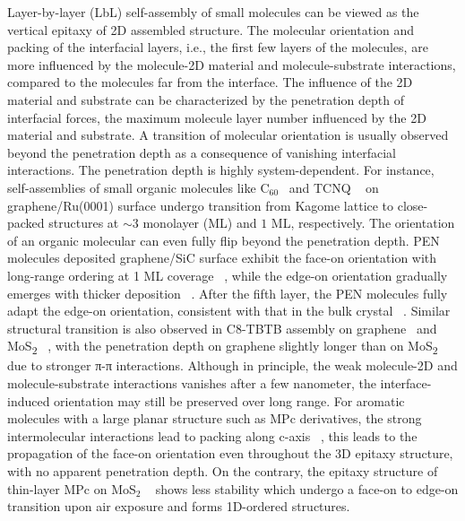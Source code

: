 Layer-by-layer (LbL) self-assembly of small molecules can be viewed as
the vertical epitaxy of 2D assembled structure. The molecular
orientation and packing of the interfacial layers, i.e., the first few
layers of the molecules, are more influenced by the molecule-2D
material and molecule-substrate interactions, compared to the
molecules far from the interface. The influence of the 2D material and
substrate can be  characterized by the penetration depth of interfacial forces, \ie the
maximum molecule layer number influenced by the 2D material and
substrate.
%
A transition of
molecular orientation is usually observed beyond the penetration depth
as a consequence of vanishing interfacial interactions.
%
The penetration depth is highly system-dependent.
%
For instance, self-assemblies of small organic molecules like
C\(_{\text{60}}\)~\cite{Lu_2012_c60_gr_moire} and TCNQ
~\cite{Maccariello_2014_TCNQ_gr_Ru} on graphene/\allowbreak{}Ru(0001) surface undergo
transition from Kagome lattice to close-packed structures at $\sim$3
monolayer (ML) and $1$ ML, respectively.
%
The orientation of an organic molecular can even fully flip beyond the
penetration depth. PEN molecules deposited graphene/SiC surface
exhibit the face-on orientation with long-range ordering at 1 ML
coverage ~\cite{Jung_2014_pentacene}, while the edge-on orientation
gradually emerges with thicker deposition
~\cite{Chen_2008_transition_pentacene}. After the fifth layer, the PEN
molecules fully adapt the edge-on orientation, consistent with that in
the bulk crystal ~\cite{Ruiz_2004_bulk_pentacene}. Similar structural
transition is also observed in C8-TBTB assembly on
graphene~\cite{He_2014_C8BTBT_gr} and MoS\textsubscript{2}
~\cite{He_2015_C8BTBT_MoS2}, with the penetration depth on graphene slightly longer than on MoS\textsubscript{2} due to stronger π-π interactions.
%
Although in principle, the weak molecule-2D and molecule-substrate
interactions vanishes after a few nano\-meter, the interface-induced orientation may still be preserved over long range.
For aromatic molecules with a large planar structure
such as MPc derivatives, the strong intermolecular interactions lead
to packing along c-axis
~\cite{Ren_2011_DFT_CuPc_epi_gr,Jiang_2014_F16Pc,Yoon_2010_crystal_F16cuPc},
this leads to the propagation of the face-on orientation even
throughout the 3D epitaxy structure, with no apparent penetration
depth. On the contrary, the epitaxy
structure of thin-layer MPc on MoS\(_{\text{2}}\)
~\cite{Zhang_2015_CuPc_MoS2} shows less stability which undergo a
face-on to edge-on transition upon air exposure and forms 1D-ordered
structures. 

